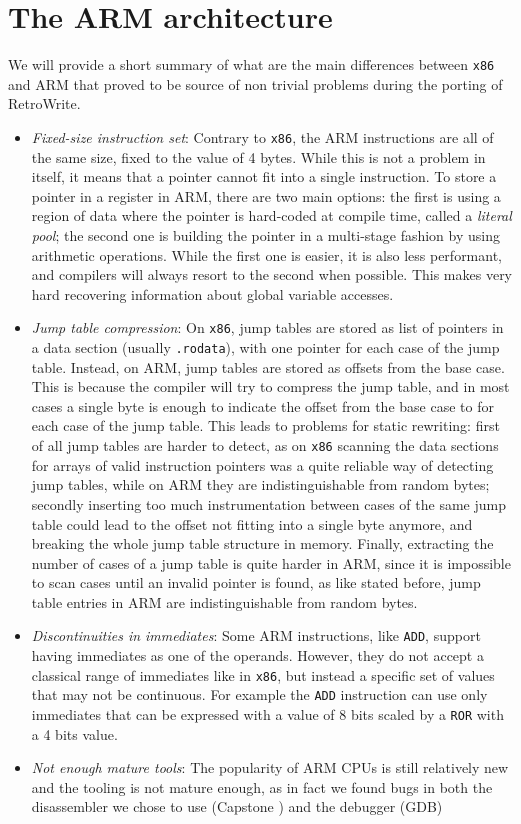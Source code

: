\documentclass[a4paper,11pt,oneside]{report}
\newcommand{\sysname}{RetroWrite\xspace}
\begin{document}
\section{The ARM architecture}
We will provide a short summary of what are the main differences between 
\texttt{x86} and ARM that proved to be source of non trivial problems during 
the porting of \sysname.
\begin{itemize}
	\item \emph{Fixed-size instruction set}: Contrary to \texttt{x86}, the ARM 
		instructions are all of the same size, fixed to the value of 4 bytes.  
		While this is not a problem in itself, it means that a pointer cannot 
		fit into a single instruction. To store a pointer in a register in ARM, 
		there are two main options: the first is using a region of data where 
		the pointer is hard-coded at compile time, called a \emph{literal 
		pool}; the second one is building the pointer in a multi-stage fashion 
		by using arithmetic operations.  While the first one is easier, it is 
		also less performant, and compilers will always resort to the second 
		when possible. This makes very hard recovering information about global 
		variable accesses.
	\item \emph{Jump table compression}: On \texttt{x86}, jump tables are 
		stored as list of pointers in a data section (usually 
		\texttt{.rodata}), with one pointer for each case of the jump table.  
		Instead, on ARM, jump tables are stored as offsets from the base case.  
		This is because the compiler will try to compress the jump table, and 
		in most cases a single byte is enough to indicate the offset from the 
		base case to for each case of the jump table. This leads to problems 
		for static rewriting: first of all jump tables are harder to detect, as 
		on \texttt{x86} scanning the data sections for arrays of valid 
		instruction pointers was a quite reliable way of detecting jump tables, 
		while on ARM they are indistinguishable from random bytes; secondly 
		inserting too much instrumentation between cases of the same jump table 
		could lead to the offset not fitting into a single byte anymore, and 
		breaking the whole jump table structure in memory.  Finally, extracting 
		the number of cases of a jump table is quite harder in ARM, since it is 
		impossible to scan cases until an invalid pointer is found, as like 
		stated before, jump table entries in ARM are indistinguishable from 
		random bytes.
	\item \emph{Discontinuities in immediates}: Some ARM instructions, like 
		\texttt{ADD}, support having immediates as one of the operands.  
		However, they do not accept a classical range of immediates like in 
		\texttt{x86}, but instead a specific set of values that may not be 
		continuous.  For example the \texttt{ADD} instruction can use only 
		immediates that can be expressed with a value of 8 bits scaled by a 
		\texttt{ROR} with a
		4 bits value.
	\item \emph{Not enough mature tools}: The popularity of ARM CPUs is still 
		relatively new and the tooling is not mature enough, as in fact we 
		found bugs in both the disassembler we chose to use (Capstone 
		\cite{capstone}) and the debugger (GDB)
\end{itemize}
\end{document}
